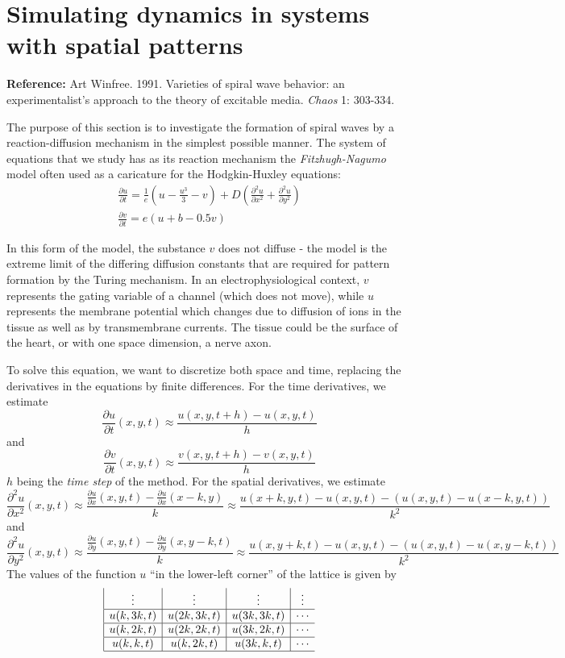 \documentclass [11pt]{article}
\numberwithin{exercise}{section}
\begin{document}
\section{Simulating dynamics in systems with spatial patterns} 

\noindent \textbf{Reference:} Art Winfree. 1991. Varieties of spiral wave behavior:
an experimentalist's approach to the theory of excitable media. {\it Chaos} 1:
303-334. 

The purpose of this section is to investigate the formation of spiral
waves by a reaction-diffusion mechanism in the simplest possible manner.
The system of equations that we study has as its reaction mechanism
the {\it Fitzhugh-Nagumo} model often used as a caricature for the 
Hodgkin-Huxley equations:
\begin{equation}
\begin{gathered}
\frac{\partial u}{\partial t} = \frac{1}{e}(u-\frac{u^3}{3} -v) +
D \left ( \frac{\partial^2 u}{\partial x^2} +
\frac{\partial^2 u}{\partial y^2} \right )\\
\frac{\partial v}{\partial t} = e(u + b - 0.5v)
\end{gathered} 
\end{equation}

In this form of the model, the substance $v$ does not diffuse - the model
is the extreme limit of the differing diffusion constants that are required for pattern formation by the Turing
mechanism. In an electrophysiological context, $v$ represents the gating variable of a channel (which does not
move), while $u$ represents the membrane potential which changes due to diffusion of ions in the tissue as well as by transmembrane currents. The tissue could be the surface of the heart, or with one space dimension, a nerve axon.

To solve this equation, we want to discretize both space and time, replacing
the derivatives in the equations by finite differences. For the time 
derivatives, we estimate
$$\frac{\partial u}{\partial t}(x,y,t) \approx \frac{u(x,y,t+h) - u(x,y,t)}{h}$$
and 
$$\frac{\partial v}{\partial t}(x,y,t) \approx \frac{v(x,y,t+h) - v(x,y,t)}{h}$$ 
$h$ being the 
{\it time step} of the method. For the spatial derivatives, we estimate
$$\frac{\partial^2 u}{\partial x^2}(x,y,t) \approx 
\frac{\frac{\partial u}{\partial x}(x,y,t) - 
\frac{\partial u}{\partial x}(x-k,y)}{k} \approx 
\frac{u(x+k,y,t) - u(x,y,t) - (u(x,y,t)- u(x-k,y,t))}{k^2}$$
and 
$$\frac{\partial^2 u}{\partial y^2}(x,y,t) \approx 
\frac{\frac{\partial u}{\partial y}(x,y,t) - 
\frac{\partial u}{\partial y}(x,y-k,t)}{k} \approx 
\frac{u(x,y+k,t) - u(x,y,t) - (u(x,y,t)-u(x,y-k,t))}{k^2}$$
The values of the function $u$ ``in the lower-left corner'' of the lattice
is given by
\[
 \begin{array}{|c|c|c|c}
 \vdots   &   \vdots   &   \vdots   &   \vdots   \\
 \hline
 {u(k,3k,t)}  &  {u(2k,3k,t)}  &  {u(3k,3k,t)}  &   \cdots   \\
 \hline
 {u(k,2k,t)}  &  {u(2k,2k,t)}  &  {u(3k,2k,t)}  &   \cdots   \\
 \hline
 {u(k,k,t)}  &  {u(k,2k,t)} &  {u(3k,k,t)} &   \cdots   \\
 \hline
 \end{array} 
\]
\end{document}
